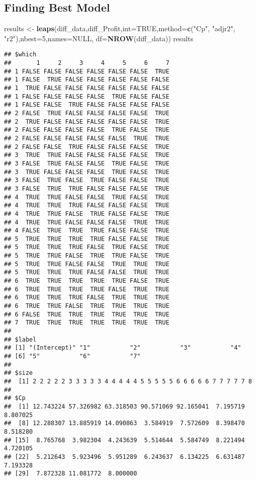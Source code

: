 \documentclass[
]{article}
\newenvironment{Shaded}{\begin{snugshade}}{\end{snugshade}}
\newcommand{\AttributeTok}[1]{\textcolor[rgb]{0.13,0.29,0.53}{#1}}
\newcommand{\ConstantTok}[1]{\textcolor[rgb]{0.56,0.35,0.01}{#1}}
\newcommand{\DecValTok}[1]{\textcolor[rgb]{0.00,0.00,0.81}{#1}}
\newcommand{\FunctionTok}[1]{\textcolor[rgb]{0.13,0.29,0.53}{\textbf{#1}}}
\newcommand{\NormalTok}[1]{#1}
\newcommand{\OtherTok}[1]{\textcolor[rgb]{0.56,0.35,0.01}{#1}}
\newcommand{\StringTok}[1]{\textcolor[rgb]{0.31,0.60,0.02}{#1}}
\begin{document}
\subsection{Finding Best Model}\label{finding-best-model}

\begin{Shaded}
\begin{Highlighting}[]
\NormalTok{results }\OtherTok{\textless{}{-}} \FunctionTok{leaps}\NormalTok{(diff\_data,diff\_Profit,}\AttributeTok{int=}\ConstantTok{TRUE}\NormalTok{,}\AttributeTok{method=}\FunctionTok{c}\NormalTok{(}\StringTok{"Cp"}\NormalTok{, }\StringTok{"adjr2"}\NormalTok{, }\StringTok{"r2"}\NormalTok{),}\AttributeTok{nbest=}\DecValTok{5}\NormalTok{,}\AttributeTok{names=}\ConstantTok{NULL}\NormalTok{, }\AttributeTok{df=}\FunctionTok{NROW}\NormalTok{(diff\_data))}
\NormalTok{results}
\end{Highlighting}
\end{Shaded}

\begin{verbatim}
## $which
##       1     2     3     4     5     6     7
## 1 FALSE FALSE FALSE FALSE FALSE FALSE  TRUE
## 1 FALSE  TRUE FALSE FALSE FALSE FALSE FALSE
## 1  TRUE FALSE FALSE FALSE FALSE FALSE FALSE
## 1 FALSE FALSE FALSE FALSE  TRUE FALSE FALSE
## 1 FALSE FALSE  TRUE FALSE FALSE FALSE FALSE
## 2 FALSE  TRUE FALSE FALSE FALSE FALSE  TRUE
## 2  TRUE FALSE FALSE FALSE FALSE FALSE  TRUE
## 2 FALSE FALSE FALSE FALSE  TRUE FALSE  TRUE
## 2 FALSE FALSE FALSE FALSE FALSE  TRUE  TRUE
## 2 FALSE FALSE  TRUE FALSE FALSE FALSE  TRUE
## 3  TRUE  TRUE FALSE FALSE FALSE FALSE  TRUE
## 3 FALSE  TRUE FALSE FALSE  TRUE FALSE  TRUE
## 3  TRUE FALSE FALSE FALSE  TRUE FALSE  TRUE
## 3 FALSE  TRUE FALSE  TRUE FALSE FALSE  TRUE
## 3 FALSE  TRUE  TRUE FALSE FALSE FALSE  TRUE
## 4  TRUE  TRUE FALSE FALSE  TRUE FALSE  TRUE
## 4  TRUE  TRUE  TRUE FALSE FALSE FALSE  TRUE
## 4  TRUE  TRUE FALSE  TRUE FALSE FALSE  TRUE
## 4  TRUE  TRUE FALSE FALSE FALSE  TRUE  TRUE
## 4 FALSE  TRUE  TRUE  TRUE FALSE FALSE  TRUE
## 5  TRUE  TRUE  TRUE  TRUE FALSE FALSE  TRUE
## 5  TRUE  TRUE  TRUE FALSE  TRUE FALSE  TRUE
## 5  TRUE  TRUE FALSE  TRUE  TRUE FALSE  TRUE
## 5  TRUE  TRUE FALSE FALSE  TRUE  TRUE  TRUE
## 5  TRUE  TRUE  TRUE FALSE FALSE  TRUE  TRUE
## 6  TRUE  TRUE  TRUE  TRUE  TRUE FALSE  TRUE
## 6  TRUE  TRUE  TRUE  TRUE FALSE  TRUE  TRUE
## 6  TRUE  TRUE  TRUE FALSE  TRUE  TRUE  TRUE
## 6  TRUE  TRUE FALSE  TRUE  TRUE  TRUE  TRUE
## 6 FALSE  TRUE  TRUE  TRUE  TRUE  TRUE  TRUE
## 7  TRUE  TRUE  TRUE  TRUE  TRUE  TRUE  TRUE
## 
## $label
## [1] "(Intercept)" "1"           "2"           "3"           "4"          
## [6] "5"           "6"           "7"          
## 
## $size
##  [1] 2 2 2 2 2 3 3 3 3 3 4 4 4 4 4 5 5 5 5 5 6 6 6 6 6 7 7 7 7 7 8
## 
## $Cp
##  [1] 12.743224 57.326982 63.318503 90.571069 92.165041  7.195719  8.807025
##  [8] 12.288307 13.885919 14.090863  3.584919  7.572609  8.398470  8.518280
## [15]  8.765768  3.982304  4.243639  5.514644  5.584749  8.221494  4.720105
## [22]  5.212643  5.923496  5.951289  6.243637  6.134225  6.631487  7.193328
## [29]  7.872328 11.081772  8.000000
\end{verbatim}
\end{document}
